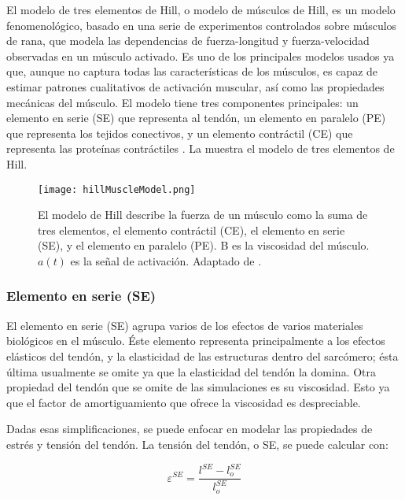 El modelo de tres elementos de Hill, o modelo de músculos de Hill, es un modelo fenomenológico, basado en una serie de experimentos controlados sobre músculos de rana, que modela las dependencias de fuerza-longitud y fuerza-velocidad observadas en un músculo activado. Es uno de los principales modelos usados ya que, aunque no captura todas las características de los músculos, es capaz de estimar patrones cualitativos de activación muscular, así como las propiedades mecánicas del músculo. El modelo tiene tres componentes principales: un elemento en serie (SE) que representa al tendón, un elemento en paralelo (PE) que representa los tejidos conectivos, y un elemento contráctil (CE) que representa las proteínas contráctiles \citep{biomechanics2012nordin}. La  muestra el modelo de tres elementos de Hill.

\begin{figure}[!ht]
	\centering
		\texttt{[image: hillMuscleModel.png]}
	\caption[Modelo de tres elementos de Hill.]{El modelo de Hill describe la fuerza de un músculo como la suma de tres elementos, el elemento contráctil (CE), el elemento en serie (SE), y el elemento en paralelo (PE). B es la viscosidad del músculo. $a(t)$ es la señal de activación. Adaptado de \citep{lee2010survey}.}
	\label{fig:hillMuscleModel}
\end{figure}

\subsubsection{Elemento en serie (SE)}

El elemento en serie (SE) agrupa varios de los efectos de varios materiales biológicos en el músculo. Éste elemento representa principalmente a los efectos elásticos del tendón, y la elasticidad de las estructuras dentro del sarcómero; ésta última usualmente se omite ya que la elasticidad del tendón la domina. Otra propiedad del tendón que se omite de las simulaciones es su viscosidad. Esto ya que el factor de amortiguamiento que ofrece la viscosidad es despreciable.

Dadas esas simplificaciones, se puede enfocar en modelar las propiedades de estrés y tensión del tendón. La tensión del tendón, o SE, se puede calcular con:

\begin{equation}
	\varepsilon^{SE} = \frac{l^{SE}-l_o^{SE}}{l_o^{SE}}
\end{equation}

